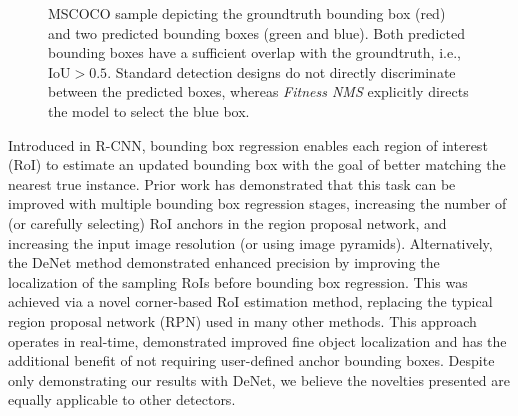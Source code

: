 \documentclass[10pt,twocolumn,letterpaper]{article}
\begin{document}
\begin{figure}[tb]
\centering
{}
\caption{MSCOCO\cite{mscoco} sample depicting the groundtruth bounding box (red) and two predicted bounding boxes (green and blue). Both predicted bounding boxes have a sufficient overlap with the groundtruth, i.e., $\mathrm{IoU} > 0.5$. Standard detection designs do not directly discriminate between the predicted boxes, whereas \textit{Fitness NMS} explicitly directs the model to select the blue box.}
\end{figure}

Introduced in R-CNN\cite{rcnn}, bounding box regression enables each region of interest (RoI) to estimate an updated bounding box with the goal of better matching the nearest true instance. Prior work has demonstrated that this task can be improved with multiple bounding box regression stages\cite{iterative-bbox}, increasing the number of (or carefully selecting) RoI anchors in the region proposal network\cite{ssd}\cite{retinanet}, and increasing the input image resolution (or using image pyramids)\cite{fpn}\cite{retinanet}. Alternatively, the DeNet\cite{denet} method demonstrated enhanced precision by improving the localization of the sampling RoIs before bounding box regression. This was achieved via a novel corner-based RoI estimation method, replacing the typical region proposal network (RPN)\cite{faster-rcnn} used in many other methods. This approach operates in real-time, demonstrated improved fine object localization and has the additional benefit of not requiring user-defined anchor bounding boxes. Despite only demonstrating our results with DeNet, we believe the novelties presented are equally applicable to other detectors. 

\end{document}
